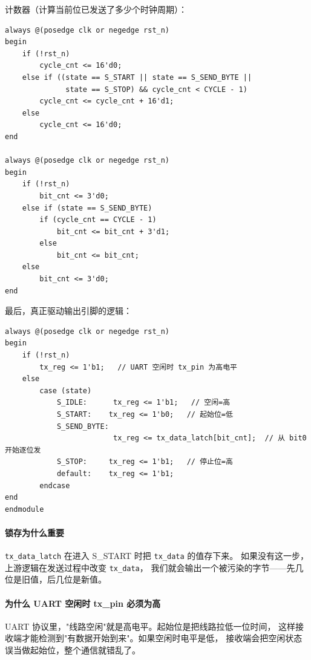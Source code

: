 计数器（计算当前位已发送了多少个时钟周期）：

\begin{lstlisting}[style=verilog]
always @(posedge clk or negedge rst_n)
begin
    if (!rst_n)
        cycle_cnt <= 16'd0;
    else if ((state == S_START || state == S_SEND_BYTE ||
              state == S_STOP) && cycle_cnt < CYCLE - 1)
        cycle_cnt <= cycle_cnt + 16'd1;
    else
        cycle_cnt <= 16'd0;
end

always @(posedge clk or negedge rst_n)
begin
    if (!rst_n)
        bit_cnt <= 3'd0;
    else if (state == S_SEND_BYTE)
        if (cycle_cnt == CYCLE - 1)
            bit_cnt <= bit_cnt + 3'd1;
        else
            bit_cnt <= bit_cnt;
    else
        bit_cnt <= 3'd0;
end
\end{lstlisting}

最后，真正驱动输出引脚的逻辑：

\begin{lstlisting}[style=verilog]
always @(posedge clk or negedge rst_n)
begin
    if (!rst_n)
        tx_reg <= 1'b1;   // UART 空闲时 tx_pin 为高电平
    else
        case (state)
            S_IDLE:      tx_reg <= 1'b1;   // 空闲=高
            S_START:    tx_reg <= 1'b0;   // 起始位=低
            S_SEND_BYTE:
                         tx_reg <= tx_data_latch[bit_cnt];  // 从 bit0 开始逐位发
            S_STOP:     tx_reg <= 1'b1;   // 停止位=高
            default:    tx_reg <= 1'b1;
        endcase
end
endmodule
\end{lstlisting}

\paragraph{锁存为什么重要}
\texttt{tx\_data\_latch} 在进入 S\_START 时把 \texttt{tx\_data} 的值存下来。
如果没有这一步，上游逻辑在发送过程中改变 \texttt{tx\_data}，
我们就会输出一个被污染的字节——先几位是旧值，后几位是新值。

\paragraph{为什么 UART 空闲时 tx\_pin 必须为高}
UART 协议里，"线路空闲"就是高电平。起始位是把线路拉低一位时间，
这样接收端才能检测到"有数据开始到来"。如果空闲时电平是低，
接收端会把空闲状态误当做起始位，整个通信就错乱了。
